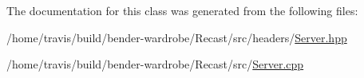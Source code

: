 The documentation for this class was generated from the following files\-:\begin{DoxyCompactItemize}
\item 
/home/travis/build/bender-\/wardrobe/\-Recast/src/headers/\hyperlink{_server_8hpp}{Server.\-hpp}\item 
/home/travis/build/bender-\/wardrobe/\-Recast/src/\hyperlink{_server_8cpp}{Server.\-cpp}\end{DoxyCompactItemize}
